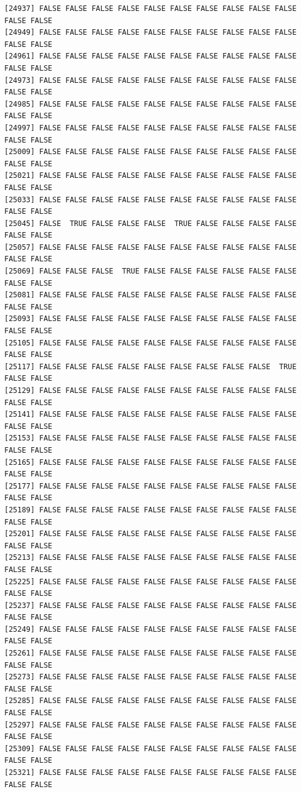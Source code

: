 \documentclass[
  a4paper,
  DIV=11,
  numbers=noendperiod]{scrartcl}
\begin{document}
\begin{verbatim}
[24937] FALSE FALSE FALSE FALSE FALSE FALSE FALSE FALSE FALSE FALSE FALSE FALSE
[24949] FALSE FALSE FALSE FALSE FALSE FALSE FALSE FALSE FALSE FALSE FALSE FALSE
[24961] FALSE FALSE FALSE FALSE FALSE FALSE FALSE FALSE FALSE FALSE FALSE FALSE
[24973] FALSE FALSE FALSE FALSE FALSE FALSE FALSE FALSE FALSE FALSE FALSE FALSE
[24985] FALSE FALSE FALSE FALSE FALSE FALSE FALSE FALSE FALSE FALSE FALSE FALSE
[24997] FALSE FALSE FALSE FALSE FALSE FALSE FALSE FALSE FALSE FALSE FALSE FALSE
[25009] FALSE FALSE FALSE FALSE FALSE FALSE FALSE FALSE FALSE FALSE FALSE FALSE
[25021] FALSE FALSE FALSE FALSE FALSE FALSE FALSE FALSE FALSE FALSE FALSE FALSE
[25033] FALSE FALSE FALSE FALSE FALSE FALSE FALSE FALSE FALSE FALSE FALSE FALSE
[25045] FALSE  TRUE FALSE FALSE FALSE  TRUE FALSE FALSE FALSE FALSE FALSE FALSE
[25057] FALSE FALSE FALSE FALSE FALSE FALSE FALSE FALSE FALSE FALSE FALSE FALSE
[25069] FALSE FALSE FALSE  TRUE FALSE FALSE FALSE FALSE FALSE FALSE FALSE FALSE
[25081] FALSE FALSE FALSE FALSE FALSE FALSE FALSE FALSE FALSE FALSE FALSE FALSE
[25093] FALSE FALSE FALSE FALSE FALSE FALSE FALSE FALSE FALSE FALSE FALSE FALSE
[25105] FALSE FALSE FALSE FALSE FALSE FALSE FALSE FALSE FALSE FALSE FALSE FALSE
[25117] FALSE FALSE FALSE FALSE FALSE FALSE FALSE FALSE FALSE  TRUE FALSE FALSE
[25129] FALSE FALSE FALSE FALSE FALSE FALSE FALSE FALSE FALSE FALSE FALSE FALSE
[25141] FALSE FALSE FALSE FALSE FALSE FALSE FALSE FALSE FALSE FALSE FALSE FALSE
[25153] FALSE FALSE FALSE FALSE FALSE FALSE FALSE FALSE FALSE FALSE FALSE FALSE
[25165] FALSE FALSE FALSE FALSE FALSE FALSE FALSE FALSE FALSE FALSE FALSE FALSE
[25177] FALSE FALSE FALSE FALSE FALSE FALSE FALSE FALSE FALSE FALSE FALSE FALSE
[25189] FALSE FALSE FALSE FALSE FALSE FALSE FALSE FALSE FALSE FALSE FALSE FALSE
[25201] FALSE FALSE FALSE FALSE FALSE FALSE FALSE FALSE FALSE FALSE FALSE FALSE
[25213] FALSE FALSE FALSE FALSE FALSE FALSE FALSE FALSE FALSE FALSE FALSE FALSE
[25225] FALSE FALSE FALSE FALSE FALSE FALSE FALSE FALSE FALSE FALSE FALSE FALSE
[25237] FALSE FALSE FALSE FALSE FALSE FALSE FALSE FALSE FALSE FALSE FALSE FALSE
[25249] FALSE FALSE FALSE FALSE FALSE FALSE FALSE FALSE FALSE FALSE FALSE FALSE
[25261] FALSE FALSE FALSE FALSE FALSE FALSE FALSE FALSE FALSE FALSE FALSE FALSE
[25273] FALSE FALSE FALSE FALSE FALSE FALSE FALSE FALSE FALSE FALSE FALSE FALSE
[25285] FALSE FALSE FALSE FALSE FALSE FALSE FALSE FALSE FALSE FALSE FALSE FALSE
[25297] FALSE FALSE FALSE FALSE FALSE FALSE FALSE FALSE FALSE FALSE FALSE FALSE
[25309] FALSE FALSE FALSE FALSE FALSE FALSE FALSE FALSE FALSE FALSE FALSE FALSE
[25321] FALSE FALSE FALSE FALSE FALSE FALSE FALSE FALSE FALSE FALSE FALSE FALSE

\end{verbatim}
\end{document}
